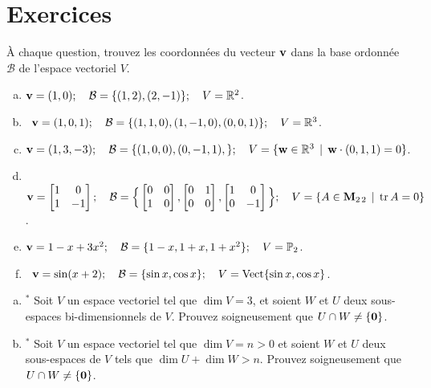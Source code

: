 \section*{Exercices}




\begin{prob}
\label{prob10.1} À chaque question, trouvez les coordonnées du vecteur $\mathbf{v}$ dans la base ordonnée $\mathcal B$ de l'espace vectoriel $V$.\medskip
\begin{enumerate}[(a)] 
\item $\mathbf{v}=(1,0); \quad \mathcal B=\{(1,2), (2,-1)\};\quad V=\mathbb{R}^2$.\medskip
 
\item\sov~$\mathbf{v}=(1,0, 1); \quad\mathcal B=\{(1,1, 0), (1, -1, 0),(0,0,1) \};\quad V=\mathbb{R}^3$.\medskip
 
\item $\mathbf{v}=(1,3, -3);\quad \mathcal B=\{(1,0, 0), (0, -1, 1), \};\quad V=\{ \mathbf{w}\in\mathbb{R}^3 \, \mid \, \mathbf{w}\cdot (0,1,1)=0\}$.\medskip
 
\item\sov~$\vv=\bmatrix 1&0\\1&-1\endbmatrix;\quad \mathcal B=\Big\{\bmatrix 0&0\\1&0\endbmatrix, \bmatrix 0&1\\0&0\endbmatrix , \bmatrix 1&0\\0&-1\endbmatrix \Big\};\quad V=\set{A \in  \M_{2 \,2}  \st \tr A=0}$.\medskip
 
\item $\mathbf{v} =1-x+3x^2;\quad \mathcal B=\{1-x, 1+x, 1+x^2 \};\quad V=\mathbb{P}_2$.\medskip
 

\item\sov~$\mathbf{v} =\sin (x+2);\quad \mathcal B=\{\sin x, \cos x \};\quad V=\operatorname{ Vect} \normalsize\{\sin x, \cos x \normalsize\}$.\medskip
 
\end{enumerate}


 \end{prob}
\begin{prob}
\label{prob10.2}
\begin{enumerate}[(a)]

\item$^\ast$ Soit $V$ un espace vectoriel tel que $\dim V=3$, et soient $W$ et $U$ deux sous-espaces bi-dimensionnels de $V$. Prouvez soigneusement que $U \cap W \neq \{\mathbf{0}\}$.\medskip

\item$^\ast$ Soit $V$ un espace vectoriel tel que $\dim V=n>0$ et soient $W$ et $U$ deux sous-espaces de $V$ tels que $\dim U + \dim W > n$. Prouvez soigneusement que $U \cap W \neq \{\mathbf{0}\}$.\medskip

\end{enumerate}

\end{prob} 

